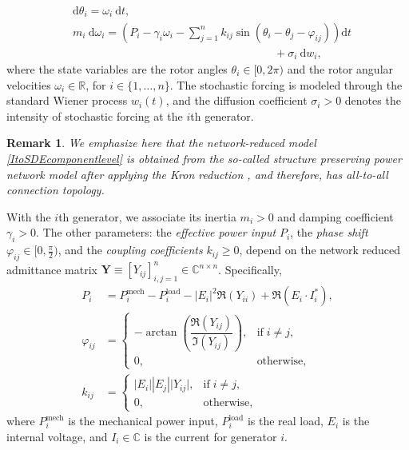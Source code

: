 \documentclass[10pt,twocolumn]{IEEEtran}
\newtheorem{remark}{Remark}
\begin{document}
\begin{subequations}
\begin{align}
&{\mathrm{d}}\theta_{i} = \omega_{i}\:{\mathrm{d}}t,\label{RotAngleGen}\\
&m_{i}\:{\mathrm{d}}\omega_{i} =	\left(\!P_{i} - \gamma_{i}\omega_{i} - \displaystyle\sum_{j=1}^{n} k_{ij}\sin\left(\theta_{i}-\theta_{j}-\varphi_{ij}\right)\!\right){\mathrm{d}}t \nonumber\\
&\qquad\qquad\qquad\qquad\qquad\qquad\qquad\qquad\qquad+\sigma_{i}\:{\mathrm{d}}w_{i},
\end{align}
\label{ItoSDEcomponentlevel}
\end{subequations}
where the state variables are the rotor angles $\theta_{i}\in[0,2\pi)$ and the rotor angular velocities $\omega_{i}\in\mathbb{R}$, for $i\in\{1,\hdots,n\}$. The stochastic forcing is modeled through the standard Wiener process $w_{i}(t)$, and the diffusion coefficient $\sigma_{i}>0$ denotes the intensity of stochastic forcing at the $i$th generator.
 
\begin{remark}
We emphasize here that the network-reduced model \eqref{ItoSDEcomponentlevel} is obtained from the so-called structure preserving power network model \cite{odun2012structure} after applying the Kron reduction \cite{dorfler2012kron}, and therefore, has all-to-all connection topology.	
\end{remark}

With the $i$th generator, we associate its inertia $m_{i}>0$ and damping coefficient $\gamma_{i}>0$. The other parameters: the \emph{effective power input} $P_{i}$, the \emph{phase shift} $\varphi_{ij}\in[0,\frac{\pi}{2})$, and the \emph{coupling coefficients} $k_{ij}\geq 0$, depend on the network reduced admittance matrix $\bm{Y}\equiv[Y_{ij}]_{i,j=1}^{n}\in\mathbb{C}^{n\times n}$. Specifically,
\begin{subequations}
\begin{align}
 P_{i} &= P_{i}^{\text{mech}} - P_{i}^{\text{load}} - |E_{i}|^{2} \Re\left(Y_{ii}\right) + \Re\left(E_i \cdot I_{i}^{*}\right),\label{defPi}\\
 \varphi_{ij} &= \begin{cases} -\arctan\left(\dfrac{\Re\left(Y_{ij}\right)}{\Im\left(Y_{ij}\right)}\right), & \text{if}\;i\neq j,\\
 0, & \text{otherwise},
 \end{cases}\\
 k_{ij} &= \begin{cases} |E_{i}| |E_{j}| \vert Y_{ij}\vert, & \text{if}\;i\neq j,\\
 0, & \text{otherwise},
 \end{cases}
\end{align}
\label{DefParam}
\end{subequations}
where $P_{i}^{\text{mech}}$ is the mechanical power input, $P_{i}^{\text{load}}$ is the real load, $E_{i}$ is the internal voltage, and $I_{i}\in\mathbb{C}$ is the current for generator $i$.
\end{document}
